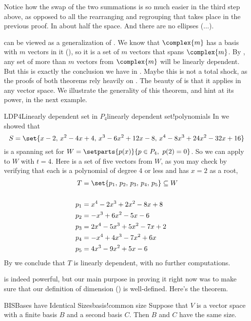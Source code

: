 %
Notice how the swap of the two summations is so much easier in the third step above, as opposed to all the rearranging and regrouping that takes place in the previous proof.  In about half the space.  And there are no ellipses ($\ldots$).\par
%
 can be viewed as a generalization of .  We know that $\complex{m}$ has a basis with $m$ vectors in it (), so it is a set of $m$ vectors that spans $\complex{m}$.  By , any set of more than $m$ vectors from $\complex{m}$ will be linearly dependent.  But this is exactly the conclusion we have in .  Maybe this is not a total shock, as the proofs of both theorems rely heavily on .   The beauty of  is that it applies in any vector space.  We illustrate the generality of this theorem, and hint at its power, in the next example.
%
\begin{example}{LDP4}{Linearly dependent set in $P_4$}{linearly dependent set!polynomials}
In  we showed that
%
\begin{equation*}
S=\set{x-2,\,x^2-4x+4,\,x^3-6x^2+12x-8,\,x^4-8x^3+24x^2-32x+16}
\end{equation*}
%
is a spanning set for $W=\setparts{p(x)}{p\in P_4,\ p(2)=0}$.  So we can apply  to $W$ with $t=4$.  Here is a set of five vectors from $W$, as you may check by verifying that each is a polynomial of degree 4 or less and has $x=2$ as a root,
%
\begin{align*}
T&=\set{p_1,\,p_2,\,p_3,\,p_4,\,p_5}\subseteq W\\
&\ \\
p_1&=x^4-2x^3+2x^2-8x+8\\
p_2&=-x^3+6x^2-5x-6\\
p_3&=2x^4-5x^3+5x^2-7x+2\\
p_4&=-x^4+4x^3-7x^2+6x\\
p_5&=4x^3-9x^2+5x-6
\end{align*}
%
By  we conclude that $T$ is linearly dependent, with no further computations.
\end{example}
%
 is indeed powerful, but our main purpose in proving it right now was to make sure that our definition of dimension () is well-defined.  Here's the theorem.
%
%
\begin{theorem}{BIS}{Bases have Identical Sizes}{basis!common size}
Suppose that $V$ is a vector space with a finite basis $B$ and a second basis $C$.  Then $B$ and $C$ have the same size.
\end{theorem}
